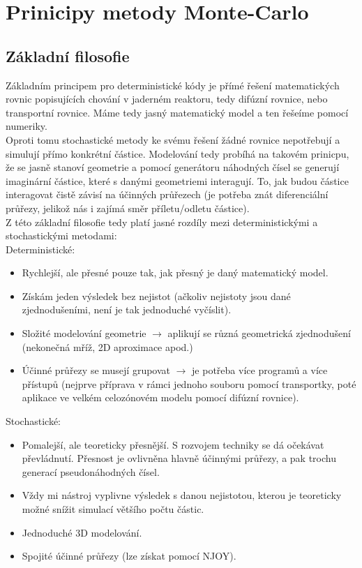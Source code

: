 \section{Prinicipy metody Monte-Carlo}

\subsection{Základní filosofie}

Základním principem pro deterministické kódy je přímé řešení matematických rovnic popisujících chování v jaderném reaktoru, tedy difúzní rovnice, nebo transportní rovnice. Máme tedy jasný matematický model a ten řešeíme pomocí numeriky.\\

Oproti tomu stochastické metody ke svému řešení žádné rovnice nepotřebují a simulují přímo konkrétní částice. Modelování tedy probíhá na takovém prinicpu, že se jasně stanoví geometrie a pomocí generátoru náhodných čísel se generují imaginární částice, které s danými geometriemi interagují. To, jak budou částice interagovat čistě závisí na účinných průřezech (je potřeba znát diferenciální průřezy, jelikož nás i zajímá směr příletu/odletu částice). \\

Z této základní filosofie tedy platí jasné rozdíly mezi deterministickými a stochastickými metodami:\\

Deterministické:
\begin{itemize}
  \item Rychlejší, ale přesné pouze tak, jak přesný je daný matematický model.
  \item Získám jeden výsledek bez nejistot (ačkoliv nejistoty jsou dané zjednodušeními, není je tak jednoduché vyčíslit).
  \item Složité modelování geometrie $\rightarrow$ aplikují se různá geometrická zjednodušení (nekonečná mříž, 2D aproximace apod.)
  \item Účinné průřezy se musejí grupovat $\rightarrow$ je potřeba více programů a více přístupů (nejprve příprava v rámci jednoho souboru pomocí transportky, poté aplikace ve velkém celozónovém modelu pomocí difúzní rovnice).
\end{itemize}

Stochastické:
\begin{itemize}
  \item Pomalejší, ale teoreticky přesnější. S rozvojem techniky se dá očekávat převládnutí. Přesnost je ovlivněna hlavně účinnými průřezy, a pak trochu generací pseudonáhodných čísel.
  \item Vždy mi nástroj vyplivne výsledek s danou nejistotou, kterou je teoreticky možné snížit simulací většího počtu částic.
  \item Jednoduché 3D modelování.
  \item Spojité účinné průřezy (lze získat pomocí NJOY).
\end{itemize}

